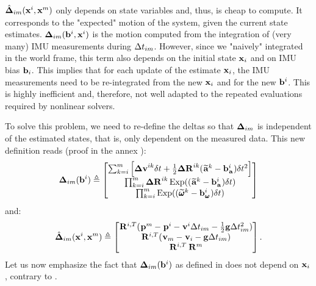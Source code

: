 $\hat{{{\bm \Delta}}}_{im}({\bf x}^i, {\bf x}^m)$ only depends on state variables and, thus, is cheap to compute. It corresponds to the "expected" motion of the system, given the current state estimates. 
${{\bm \Delta}}_{im}({\bf b}^i, {\bf x}^i)$ is the motion computed from the integration of (very many) IMU measurements during $\Delta t_{im}$. However, since we "naively" integrated
in the world frame, this term also depends on the initial state ${\bf x}_i$ and on IMU bias ${\bf b}_i$. This implies that for each update of the estimate ${\bf x}_i$, the IMU measurements 
need to be re-integrated from the new ${\bf x}_i$ and for the new ${\bf b}^i$. This is highly inefficient and, therefore, not well adapted to the repeated evaluations required by nonlinear 
solvers.

To solve this problem, we need to re-define the deltas so that ${{\bm \Delta}}_{im}$ is independent of the estimated states, that is, only dependent on the measured data. This new definition 
reads \cite{lupton-09, forster2015imu} (proof in the annex ):
%
\begin{align}
    {{\bm \Delta}}_{im}({\bf b}^i) \triangleq 
    \begin{bmatrix}
    \sum_{k=i}^{m} \Big[{\bm \Delta {\bf v}}^{ik}\delta t +  \frac{1}{2} {\bm \Delta {\bf R}}^{ik} (\prescript{}{}{\widetilde{{\bf a}}}_{}^k - {\bf b}_{\prescript{}{}{{\bf a}}_{}}^i)\delta t^2 \Big] \\
    \prod_{k=i}^{m} {\bm \Delta {\bf R}}^{ik} \operatorname*{Exp}((\prescript{}{}{\widetilde{{\bf a}}}_{}^k - {\bf b}_{\prescript{}{}{{\bf a}}_{}}^i)\delta t)  \\
    \prod_{k=i}^{m} \operatorname*{Exp}((\prescript{}{}{\widetilde{\pmb{\omega}}}_{}^k - {\bf b}_{\prescript{}{}{\pmb{\omega}}_{}}^i)\delta t)  
    \end{bmatrix}
    \label{eq:imu_delta_forster}
\end{align}
%
and:
%
\begin{align}
    \hat{{{\bm \Delta}}}_{im}({\bf x}^i, {\bf x}^m) \triangleq 
    \begin{bmatrix}
    \prescript{}{}{{\bf R}}_{}^{i,T}(\prescript{}{}{{\bf p}}_{}^m - \prescript{}{}{{\bf p}}_{}^i - \prescript{}{}{{\bf v}}_{}^i \Delta t_{im} - \frac{1}{2} {\bf g} \Delta t_{im}^2) \\
    \prescript{}{}{{\bf R}}_{}^{i,T} (\prescript{}{}{{\bf v}}_{m} - \prescript{}{}{{\bf v}}_{i} - {\bf g} \Delta t_{im})  \\
    \prescript{}{}{{\bf R}}_{}^{i,T} \prescript{}{}{{\bf R}}_{}^{m}  
    \end{bmatrix}. 
    \label{eq:boxminus-forster}
\end{align}
%
Let us now emphasize the fact that ${{\bm \Delta}}_{im}({\bf b}^i)$ as defined in  does not depend on ${\bf x}_i$, contrary to . 


